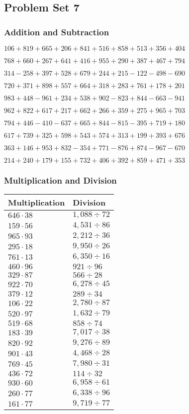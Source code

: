 \hypertarget{problem-set-7-2}{%
\subsection{Problem Set 7}\label{problem-set-7-2}}

\hypertarget{addition-and-subtraction-107}{%
\subsubsection{Addition and
Subtraction}\label{addition-and-subtraction-107}}

\(106 + 819 + 665 + 206 + 841 + 516 + 858 + 513 + 356 + 404\)

\(768 + 660 + 267 + 641 + 416 + 955 + 290 + 387 + 467 + 794\)

\(314 - 258 + 397 + 528 + 679 + 244 + 215 - 122 - 498 - 690\)

\(720 + 371 + 898 + 557 + 664 + 318 + 283 + 761 + 178 + 201\)

\(983 + 448 - 961 + 234 + 538 + 902 - 823 + 844 - 663 - 941\)

\(962 + 822 + 617 + 217 + 662 + 266 + 359 + 275 + 965 + 703\)

\(794 + 446 - 410 - 637 + 665 + 844 - 815 - 395 + 719 + 180\)

\(617 + 739 + 325 + 598 + 543 + 574 + 313 + 199 + 393 + 676\)

\(363 + 146 + 953 + 832 - 354 + 771 - 876 + 874 - 967 - 670\)

\(214 + 240 + 179 + 155 + 732 + 406 + 392 + 859 + 471 + 353\)

\hypertarget{multiplication-and-division-107}{%
\subsubsection{Multiplication and
Division}\label{multiplication-and-division-107}}

\begin{longtable}[]{@{}ll@{}}
\toprule
Multiplication & Division\tabularnewline
\midrule
\endhead
\(646 \cdot 38\) & \(1,088÷72\)\tabularnewline
\(159 \cdot 56\) & \(4,531÷86\)\tabularnewline
\(965 \cdot 93\) & \(2,212÷36\)\tabularnewline
\(295 \cdot 18\) & \(9,950÷26\)\tabularnewline
\(761 \cdot 13\) & \(6,350÷16\)\tabularnewline
\(460 \cdot 96\) & \(921÷96\)\tabularnewline
\(329 \cdot 87\) & \(566÷28\)\tabularnewline
\(922 \cdot 70\) & \(6,278÷45\)\tabularnewline
\(379 \cdot 12\) & \(289÷34\)\tabularnewline
\(106 \cdot 22\) & \(2,780÷87\)\tabularnewline
\(520 \cdot 97\) & \(1,632÷79\)\tabularnewline
\(519 \cdot 68\) & \(858÷74\)\tabularnewline
\(183 \cdot 39\) & \(7,017÷38\)\tabularnewline
\(820 \cdot 92\) & \(9,276÷89\)\tabularnewline
\(901 \cdot 43\) & \(4,468÷28\)\tabularnewline
\(769 \cdot 45\) & \(7,980÷31\)\tabularnewline
\(436 \cdot 72\) & \(114÷32\)\tabularnewline
\(930 \cdot 60\) & \(6,958÷61\)\tabularnewline
\(260 \cdot 77\) & \(6,338÷96\)\tabularnewline
\(161 \cdot 77\) & \(9,719÷77\)\tabularnewline
\bottomrule
\end{longtable}

